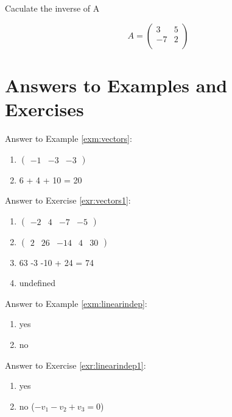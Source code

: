 \documentclass[]{book}
\providecommand{\tightlist}{%
  \setlength{\itemsep}{0pt}\setlength{\parskip}{0pt}}
\theoremstyle{definition}
\theoremstyle{definition}
\theoremstyle{definition}
\theoremstyle{remark}
\begin{document}
Caculate the inverse of A

\[A = \begin{pmatrix}
            3 & 5\\
            -7 & 2\\
        \end{pmatrix}\]

\hypertarget{answers-to-examples-and-exercises}{%
\section*{Answers to Examples and Exercises}\label{answers-to-examples-and-exercises}}

Answer to Example \ref{exm:vectors}:

\begin{enumerate}
\def\labelenumi{\arabic{enumi}.}
\tightlist
\item
  \(\begin{pmatrix} -1 &-3&-3 \end{pmatrix}\)
\item
  6 + 4 + 10 = 20
\end{enumerate}

Answer to Exercise \ref{exr:vectors1}:

\begin{enumerate}
\def\labelenumi{\arabic{enumi}.}
\tightlist
\item
  \(\begin{pmatrix} -2 &4&-7&-5 \end{pmatrix}\)
\item
  \(\begin{pmatrix} 2 &26&-14&4&30 \end{pmatrix}\)
\item
  63 -3 -10 + 24 = 74
\item
  undefined
\end{enumerate}

Answer to Example \ref{exm:linearindep}:

\begin{enumerate}
\def\labelenumi{\arabic{enumi}.}
\tightlist
\item
  yes
\item
  no
\end{enumerate}

Answer to Exercise \ref{exr:linearindep1}:

\begin{enumerate}
\def\labelenumi{\arabic{enumi}.}
\tightlist
\item
  yes
\item
  no (\(-v_1 -v_2 + v_3 = 0\))
\end{enumerate}
\end{document}
